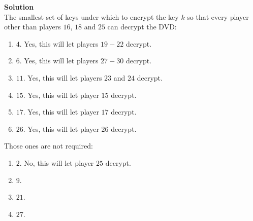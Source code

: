 \documentclass[a4paper,12pt]{article}
\begin{document}
\textbf{Solution} \\

The smallest set of keys under which to encrypt the key $k$ so that every player other than players $16$, $18$ and $25$ can decrypt the DVD:
%
\begin{enumerate}
\item $4$. Yes, this will let players $19 - 22$ decrypt.
\item $6$. Yes, this will let players $27 - 30$ decrypt.
\item $11$. Yes, this will let players $23$ and $24$ decrypt.
\item $15$. Yes, this will let player $15$ decrypt.
\item $17$. Yes, this will let player $17$ decrypt.
\item $26$. Yes, this will let player $26$ decrypt.
\end{enumerate}
%
Those ones are not required:
%
\begin{enumerate}
\item $2$. No, this will let player $25$ decrypt.
\item $9$.
\item $21$.
\item $27$. 
\end{enumerate}
\end{document}

